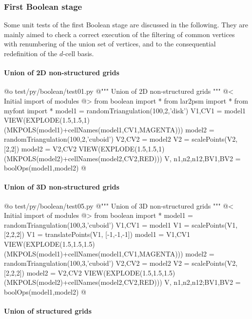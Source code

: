 \documentclass[11pt,oneside]{article}	%
\begin{document}
\subsubsection{First Boolean stage}

Some unit tests of the first Boolean stage are discussed in the following. They are mainly aimed to check a correct execution of the filtering of common vertices with renumbering of the union set of vertices, and to the consequential redefinition of the $d$-cell basis.

\paragraph{Union of 2D non-structured grids}

@o test/py/boolean/test01.py
@{""" Union of 2D non-structured grids """
@< Initial import of modules @>
from boolean import *
from lar2psm import *
from myfont import *
model1 = randomTriangulation(100,2,'disk')
V1,CV1 = model1
VIEW(EXPLODE(1.5,1.5,1)(MKPOLS(model1)+cellNames(model1,CV1,MAGENTA)))
model2 = randomTriangulation(100,2,'cuboid')
V2,CV2 = model2
V2 = scalePoints(V2, [2,2])
model2 = V2,CV2 
VIEW(EXPLODE(1.5,1.5,1)(MKPOLS(model2)+cellNames(model2,CV2,RED)))
V, n1,n2,n12,BV1,BV2 = boolOps(model1,model2)
@}

\paragraph{Union of 3D non-structured grids}

@o test/py/boolean/test05.py
@{""" Union of 3D non-structured grids """
@< Initial import of modules @>
from boolean import *
model1 = randomTriangulation(100,3,'cuboid')
V1,CV1 = model1
V1 = scalePoints(V1, [2,2,2])
V1 = translatePoints(V1, [-1,-1,-1])
model1 = V1,CV1 
VIEW(EXPLODE(1.5,1.5,1.5)(MKPOLS(model1)+cellNames(model1,CV1,MAGENTA)))
model2 = randomTriangulation(100,3,'cuboid')
V2,CV2 = model2
V2 = scalePoints(V2, [2,2,2])
model2 = V2,CV2 
VIEW(EXPLODE(1.5,1.5,1.5)(MKPOLS(model2)+cellNames(model2,CV2,RED)))
V, n1,n2,n12;BV1,BV2 = boolOps(model1,model2)
@}


\paragraph{Union of structured grids}
\end{document}
